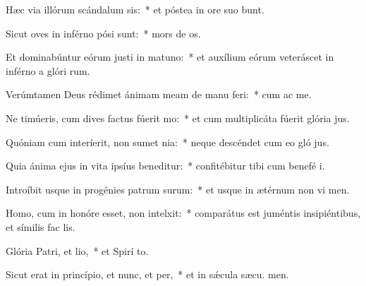 \item Hæc via illórum scándalum sis:~* et póstea in ore suo bunt.
\item Sicut oves in inférno pósi sunt:~* mors de os.
\item Et dominabúntur eórum justi in matuno:~* et auxílium eórum veteráscet in inférno a glóri rum.
\item Verúmtamen Deus rédimet ánimam meam de manu feri:~* cum ac me.
\item Ne timúeris, cum dives factus fúerit mo:~* et cum multiplicáta fúerit glória  jus.
\item Quóniam cum interíerit, non sumet nia:~* neque descéndet cum eo gló jus.
\item Quia ánima ejus in vita ipsíus beneditur:~* confitébitur tibi cum benefé i.
\item Introíbit usque in progénies patrum surum:~* et usque in ætérnum non vi men.
\item Homo, cum in honóre esset, non intelxit:~* comparátus est juméntis insipiéntibus, et símilis fac  lis.
\item Glória Patri, et lio,~* et Spirí to.
\item Sicut erat in princípio, et nunc, et per,~* et in sǽcula sæcu. men.
